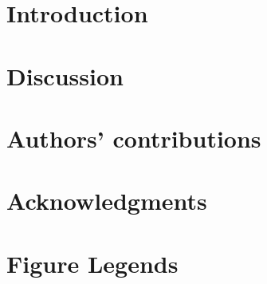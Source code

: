 \section{Introduction}






\section{Discussion}


%

\section*{Authors' contributions}


\section*{Acknowledgments}




\pagebreak
\section*{Figure Legends}


\FloatBarrier

%
%
%
%

